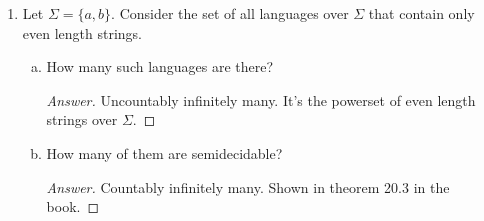 \documentclass[10pt]{article}
\begin{document}
\begin{enumerate}[1)]

\item
Let $\Sigma = \{a, b\}$. Consider the set of all languages over $\Sigma$ that contain only even length strings.
\begin{enumerate}[a)]
\item
How many such languages are there?
\begin{proof}[Answer]
Uncountably infinitely many.  It's the powerset of even length strings over $\Sigma$.
\end{proof}


\item
How many of them are semidecidable?
\begin{proof}[Answer]
Countably infinitely many.  Shown in theorem 20.3 in the book.
\end{proof}
\end{enumerate}
\end{enumerate}
\end{document}
